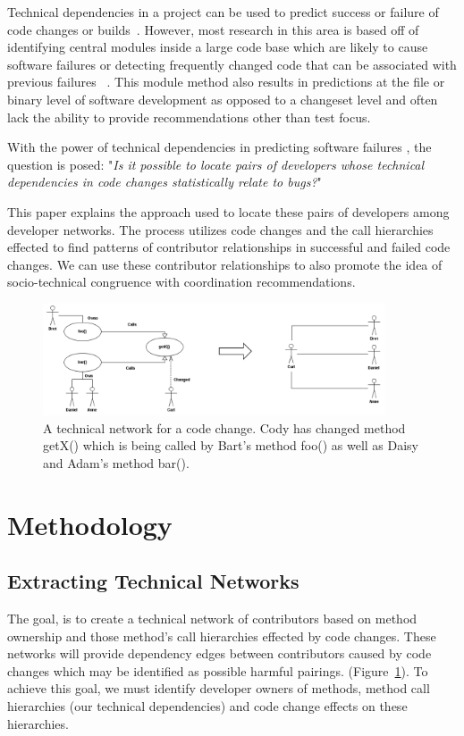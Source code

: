 \documentclass[conference]{IEEEtran}
\begin{document}
Technical dependencies in a project can be used to predict success or failure of 
code changes or builds~\cite{Pinzger:2008:DNP, Zimmermann:2008:PDU}. However, most 
research in this area is based off of identifying
central modules inside a large code base which are likely to cause software failures or
detecting frequently changed code that can be associated with previous failures
~\cite{Kim:2006:AIB}. 
This module method also results in predictions 
at the file or binary level of software development as opposed to a changeset level
and often lack the ability to provide recommendations other than test focus.

With the power of technical dependencies in predicting software failures , the question is posed: 
"\textit{Is it possible to locate pairs of developers whose technical dependencies in code changes
statistically relate to bugs?}"

This paper explains the approach used to locate these pairs of developers among developer networks.
The process utilizes code changes and the call hierarchies effected  to find patterns of contributor 
relationships in successful and failed code changes.  We can use these contributor relationships 
to also promote the idea of socio-technical congruence with coordination recommendations.

\begin{figure}[tb!]
\centering
\includegraphics[width=0.9\textwidth]{images/TecNetwork}
\caption{A technical network for a code change. Cody has changed method getX() which is being
called by Bart's method foo() as well as Daisy and Adam's method bar().\label{fig:network}}
\end{figure}

\section{Methodology}

\subsection{Extracting Technical Networks}
The goal, is to create a technical network of contributors based on method ownership
and those method's call hierarchies effected by code changes. These networks will provide
dependency edges between contributors caused by code changes which may be 
identified as possible harmful pairings. (Figure~\ref{fig:network}). To achieve this goal,
we must identify developer owners of methods, method call hierarchies (our technical
dependencies) and code change effects on these hierarchies.
\end{document}
